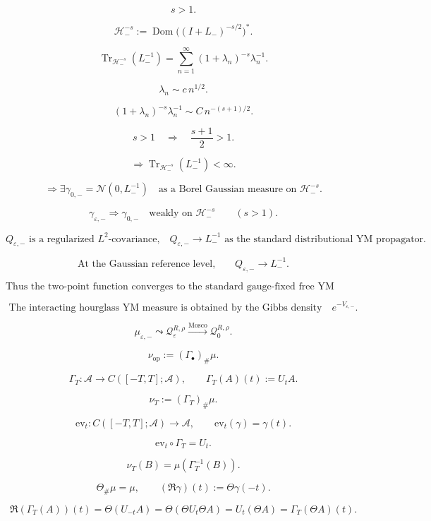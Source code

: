 \documentclass[11pt]{article}
\begin{document}
\[
s>1.
\]

\[
\mathcal H_-^{-s}
:=
\operatorname{Dom}\bigl((I+L_-)^{-s/2}\bigr)^\ast.
\]

\[
\operatorname{Tr}_{\mathcal H_-^{-s}}(L_-^{-1})
=
\sum_{n=1}^{\infty}
(1+\lambda_n)^{-s}\lambda_n^{-1}.
\]

\[
\lambda_n\sim c\,n^{1/2}.
\]

\[
(1+\lambda_n)^{-s}\lambda_n^{-1}
\sim
C\,n^{-(s+1)/2}.
\]

\[
s>1
\quad\Longrightarrow\quad
\frac{s+1}{2}>1.
\]

\[
\Longrightarrow
\operatorname{Tr}_{\mathcal H_-^{-s}}(L_-^{-1})<\infty.
\]

\[
\Longrightarrow
\exists\gamma_{0,-}
=
\mathcal N(0,L_-^{-1})
\quad
\text{as a Borel Gaussian measure on }\mathcal H_-^{-s}.
\]

\[
\gamma_{\varepsilon,-}
\Longrightarrow
\gamma_{0,-}
\quad
\text{weakly on }\mathcal H_-^{-s}
\qquad
(s>1).
\]

\[
\boxed{
Q_{\varepsilon,-}
\text{ is a regularized }L^2\text{-covariance,}
\quad
Q_{\varepsilon,-}\to L_-^{-1}
\text{ as the standard distributional YM propagator.}
}
\]

\[
\text{At the Gaussian reference level,}
\qquad
Q_{\varepsilon,-}\to L_-^{-1}.
\]

\[
\text{Thus the two-point function converges to the standard gauge-fixed free YM propagator.}
\]

\[
\text{The interacting hourglass YM measure is obtained by the Gibbs density}
\quad
e^{-V_{\varepsilon,-}}.
\]

\[
\mu_{\varepsilon,-}
\leadsto
\mathcal Q_{\varepsilon}^{R,\rho}
\overset{\mathrm{Mosco}}{\longrightarrow}
\mathcal Q_{0}^{R,\rho}.
\]

\[
\nu_{\mathrm{op}}
:=
(\Gamma_\bullet)_\#\mu.
\]

\[
\Gamma_T:\mathcal A\to C([-T,T];\mathcal A),
\qquad
\Gamma_T(A)(t):=U_tA.
\]

\[
\nu_T:=(\Gamma_T)_\#\mu.
\]

\[
\mathrm{ev}_t:C([-T,T];\mathcal A)\to\mathcal A,
\qquad
\mathrm{ev}_t(\gamma)=\gamma(t).
\]

\[
\mathrm{ev}_t\circ\Gamma_T=U_t.
\]

\[
\nu_T(B)=\mu(\Gamma_T^{-1}(B)).
\]

\[
\Theta_\#\mu=\mu,
\qquad
(\mathfrak R\gamma)(t):=\Theta\gamma(-t).
\]

\[
\mathfrak R(\Gamma_T(A))(t)
=
\Theta(U_{-t}A)
=
\Theta(\Theta U_t\Theta A)
=
U_t(\Theta A)
=
\Gamma_T(\Theta A)(t).
\]
\end{document}

